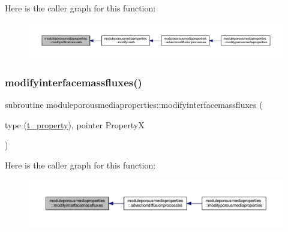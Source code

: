 Here is the caller graph for this function\+:\nopagebreak
\begin{figure}[H]
\begin{center}
\leavevmode
\includegraphics[width=350pt]{namespacemoduleporousmediaproperties_a5e436455f541e5914817fe2e3c9aa3f1_icgraph}
\end{center}
\end{figure}
\mbox{\label{namespacemoduleporousmediaproperties_a4f53429b96a7e06258d5ab4a001405e9}} 
\subsubsection{\texorpdfstring{modifyinterfacemassfluxes()}{modifyinterfacemassfluxes()}}
{\footnotesize\ttfamily subroutine moduleporousmediaproperties\+::modifyinterfacemassfluxes (\begin{DoxyParamCaption}\item[{type (\mbox{\hyperlink{structmoduleporousmediaproperties_1_1t__property}{t\+\_\+property}}), pointer}]{PropertyX }\end{DoxyParamCaption})\hspace{0.3cm}{\ttfamily [private]}}

Here is the caller graph for this function\+:\nopagebreak
\begin{figure}[H]
\begin{center}
\leavevmode
\includegraphics[width=350pt]{namespacemoduleporousmediaproperties_a4f53429b96a7e06258d5ab4a001405e9_icgraph}
\end{center}
\end{figure}
\mbox{\label{namespacemoduleporousmediaproperties_af5a9da28db32e6f4ed9c06f73a7dc775}} 

